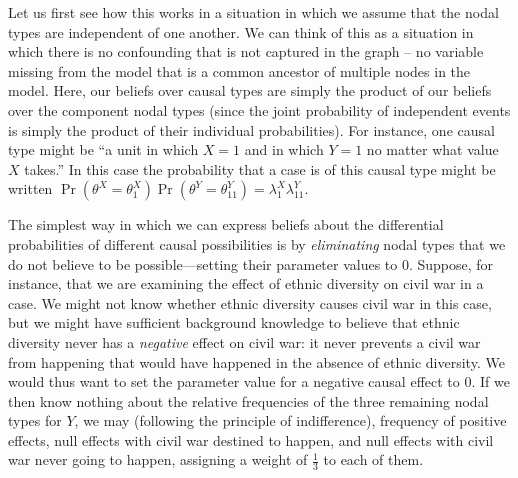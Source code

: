\documentclass[
  12pt,
]{book}
\begin{document}
Let us first see how this works in a situation in which we assume that the nodal types are independent of one another. We can think of this as a situation in which there is no confounding that is not captured in the graph -- no variable missing from the model that is a common ancestor of multiple nodes in the model. Here, our beliefs over causal types are simply the product of our beliefs over the component nodal types (since the joint probability of independent events is simply the product of their individual probabilities). For instance, one causal type might be ``a unit in which \(X=1\) and in which \(Y=1\) no matter what value \(X\) takes.'' In this case the probability that a case is of this causal type might be written \(\Pr(\theta^X = \theta^X_1)\Pr(\theta^Y = \theta^Y_{11}) = \lambda^X_1\lambda^Y_{11}\).

The simplest way in which we can express beliefs about the differential probabilities of different causal possibilities is by \emph{eliminating} nodal types that we do not believe to be possible---setting their parameter values to \(0\). Suppose, for instance, that we are examining the effect of ethnic diversity on civil war in a case. We might not know whether ethnic diversity causes civil war in this case, but we might have sufficient background knowledge to believe that ethnic diversity never has a \emph{negative} effect on civil war: it never prevents a civil war from happening that would have happened in the absence of ethnic diversity. We would thus want to set the parameter value for a negative causal effect to \(0\). If we then know nothing about the relative frequencies of the three remaining nodal types for \(Y\), we may (following the principle of indifference), frequency of positive effects, null effects with civil war destined to happen, and null effects with civil war never going to happen, assigning a weight of \(\frac{1}{3}\) to each of them.
\end{document}
